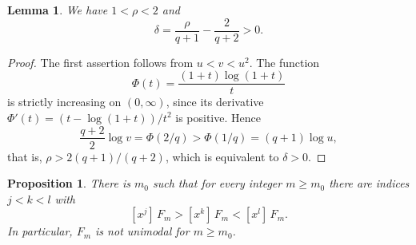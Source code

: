 \documentclass[11pt]{amsart}
\newtheorem{proposition}[theorem]{Proposition}
\newtheorem{lemma}[theorem]{Lemma}
\theoremstyle{remark}
\numberwithin{equation}{section}
\newcommand{\coef}[2]{[x^{#1}]\,#2}
\begin{document}
\begin{lemma}\label{lem:rho}
We have $1<\rho<2$ and
\[
\delta=\frac{\rho}{q+1}-\frac{2}{q+2}>0 .
\]
\end{lemma}

\begin{proof}
The first assertion follows from $u<v<u^2$. The function
\[
\Phi(t)=\frac{(1+t)\log(1+t)}{t}
\]
is strictly increasing on $(0,\infty)$, since its derivative ${\Phi'(t)=(t-\log(1+t))/t^2}$ is positive. Hence
\[
\frac{q+2}{2}\log v=\Phi(2/q)>\Phi(1/q)=(q+1)\log u ,
\]
that is, $\rho>2(q+1)/(q+2)$, which is equivalent to $\delta>0$.
\end{proof}

\begin{proposition}\label{prop:valley}
There is $m_0$ such that for every integer $m\ge m_0$ there are indices $j<k<l$ with
\[
\coef{j}{F_m}>\coef{k}{F_m}<\coef{l}{F_m}.
\]
In particular, $F_m$ is not unimodal for $m\ge m_0$.
\end{proposition}
\end{document}
